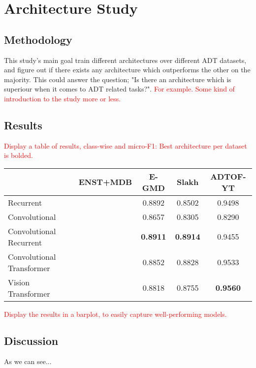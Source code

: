 \chapter{Architecture Study}

\section{Methodology}

This study's main goal train different architectures over different \gls{ADT} datasets, and figure out if there exists any architecture which outperforms the other on the majority. This could answer the question; "Is there an architecture which is superiour when it comes to \gls{ADT} related tasks?". \textcolor{red}{For example. Some kind of introduction to the study more or less.}

\section{Results}

\textcolor{red}{Display a table of results, class-wise and micro-F1:
Best architecture per dataset is bolded.}

\begin{center}
    \begin{tabular}{|l|c|c|c|c|}
    \hline
                   & ENST+MDB & E-GMD & Slakh & ADTOF-YT \\
    \hline
    Recurrent &       & 0.8892          & 0.8502          & 0.9498          \\
    Convolutional &       & 0.8657          & 0.8305          & 0.8290          \\
    Convolutional Recurrent &       & \textbf{0.8911}          & \textbf{0.8914}          & 0.9455          \\
    Convolutional Transformer &        & 0.8852          & 0.8828          & 0.9533          \\
    Vision Transformer &       & 0.8818          & 0.8755          & \textbf{0.9560}         \\   
    \hline

    \end{tabular}
\end{center}		

\textcolor{red}{Display the results in a barplot, to easily capture well-performing models.}

\section{Discussion}

As we can see...